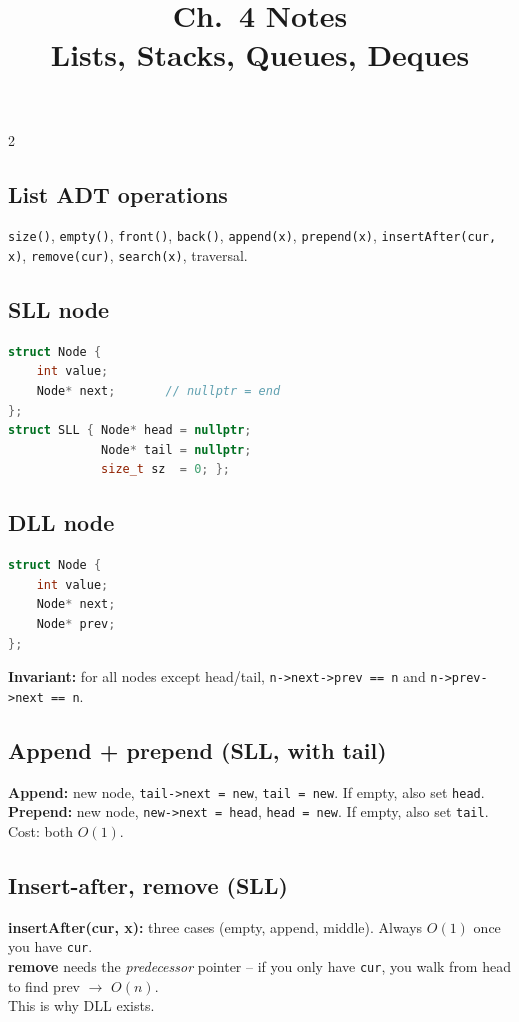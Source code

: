 \documentclass[10pt]{article}
\title{Ch.~4 Notes\\\large Lists, Stacks, Queues, Deques}
\author{}
\date{}
\begin{document}
\maketitle
\vspace{-2em}

\begin{multicols}{2}

\subsection*{List ADT operations}
\texttt{size()}, \texttt{empty()}, \texttt{front()}, \texttt{back()},
\texttt{append(x)}, \texttt{prepend(x)}, \texttt{insertAfter(cur, x)},
\texttt{remove(cur)}, \texttt{search(x)}, traversal.

\subsection*{SLL node}
\begin{lstlisting}[language=C++]
struct Node {
    int value;
    Node* next;       // nullptr = end
};
struct SLL { Node* head = nullptr;
             Node* tail = nullptr;
             size_t sz  = 0; };
\end{lstlisting}

\subsection*{DLL node}
\begin{lstlisting}[language=C++]
struct Node {
    int value;
    Node* next;
    Node* prev;
};
\end{lstlisting}
\textbf{Invariant:} for all nodes except head/tail,
\texttt{n->next->prev == n} and \texttt{n->prev->next == n}.

\subsection*{Append + prepend (SLL, with tail)}
\textbf{Append:} new node, \texttt{tail->next = new}, \texttt{tail = new}.
If empty, also set \texttt{head}.\\
\textbf{Prepend:} new node, \texttt{new->next = head}, \texttt{head = new}.
If empty, also set \texttt{tail}.\\
Cost: both $O(1)$.

\subsection*{Insert-after, remove (SLL)}
\textbf{insertAfter(cur, x):} three cases (empty, append, middle). Always
$O(1)$ once you have \texttt{cur}.\\
\textbf{remove} needs the \emph{predecessor} pointer -- if you only have
\texttt{cur}, you walk from head to find prev $\to$ $O(n)$.\\
This is why DLL exists.


\end{multicols}
\end{document}
